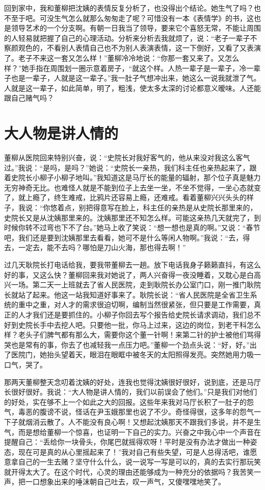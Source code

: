\documentclass[12pt,oneside]{book}
\begin{document}
回到家中，我和董柳把沈姨的表情反复分析了，也没得出个结论。她生气了吗？也不至于吧。可没生气怎么就那么匆匆走了呢？可惜没有一本《表情学》的书，这也是领导艺术的一个分支啊。有朝一日我当了领导，要来它个喜怒无常，不能让周围的人轻易就把握了自己的心理活动。分析来分析去我就烦了，说：``老子一辈子不察颜观色的，不看别人表情自己也不为别人表演表情，这一下倒好，又看了又表演了。老子不来这一套又怎么样！''董柳冷冷地说：``你那一套又来了。又怎么样？''她手指在周围划一圈示意着房子，``就这个样。人热一辈子是一辈子，冷一辈子也是一辈子，人就是这一辈子。''我一肚子气想冲出来，她这么一说我就泄了气。人就是这一辈子，如此简单，明了，粗浅，使太多太深的讨论都意义暧味。人还能跟自己赌气吗？


\chapter{大人物是讲人情的}

董柳从医院回来特别兴奋，说：``史院长对我好客气的，他从来没对我这么客气过。''我说：``是吗，是吗？''她说：``史院长一亲热，我们科主任也亲热起来了，跟着史院长小柳子小柳子地叫。''我知道这是马厅长的能量的辐射，那个位子真是魅力无穷神奇无比。也难怪人就是不能到位子上去坐一坐，不坐不觉得，一坐心态就变了，就上瘾了，终生难戒，比鸦片还容易上瘾，还难戒。看着董柳兴兴头头的样子，我说：``你悠着点，别把得意写在脸上，科主任的亲热是从史院长那里来的，史院长又是从沈姨那里来的。沈姨那里还不知怎么样。可能这亲热几天就完了，到时候你转不过弯也下不了台。''她马上收了笑说：``想一想也是真的啊。''又说：``春节吧，我们还是要到沈姨那里去看看，她可不是什么等闲人物啊。''我说：``去，得去，一定去，能不去吗？哪怕是刀山火海，那也得去啊！''

过几天耿院长打电话给我，要我带董柳去一趟。放下电话我身子籁籁直抖，有这么好的事，又这么快？董柳回来我对她说了，两人兴奋得一夜没睡着，又耽心是白高兴一场。第二天一上班就去了省人民医院，走到耿院长办公室门口，刚一推门耿院长就站了起来。他这一站我知道好事来了。耿院长说：``省人民医院是全省卫生系统的重中之重，对人才的需求很迫切啊，编制当然很紧张，但只要是工作需要，真正的人才我们还是要抓住的。小柳子你回去写个报告给史院长请求调动，我们总不好到史院长手中去挖人吧。只要他一批，你马上过来，这边的岗位，到老干科怎么样？老头子们脾气都有那么大，需要你这个董一针啊！来第二针的护士被他们骂得哭也是常有的事，你去了也减轻我一点压力吧。''董柳一个劲点头说：``好，好。''出了医院门，她抬头望着天，眼泪在眼眶中被冬天的太阳照得发亮。突然她用力吸一口气，哭了。

那两天董柳整天念叨着沈姨的好处，连我也觉得沈姨很好很好，说到底，还是马厅长很好很好。我说：``大人物是讲人情的，我们以前误会了他们。''只是我们对他们的好处，实在够不上一个如此之大的回报。这些年来我对马厅长积了一肚子的怨气，毒恶的腹谤不说，怪话在尹玉娥那里也说了不少。奇怪得很，这多年的怨气一下子就烟消云散了。人不能没有良心啊！又想起沈姨那天不跟我们多说，并不是生气，而是想给董柳一个惊喜，也证明一下自己的实力。兴奋之中我心中一个声音在提醒自己：``丢给你一块骨头，你尾巴就摇得欢呀！平时是没有办法才做出一种姿态，现在可是真的从心里摇起来了！''我对自己有些失望，可是人总得活吧，谁愿意拿自己的一生去赌？坚守什么什么，说一说写一写是可以的，真的去实行那玩笑就开得太大了。在这个时代，心灵的理由还能够成为一种充分的依据吗？我苦笑一声，把一口想象出来的唾沫朝自己吐去，叹一声气，又傻嘿嘿地笑了。
\end{document}

